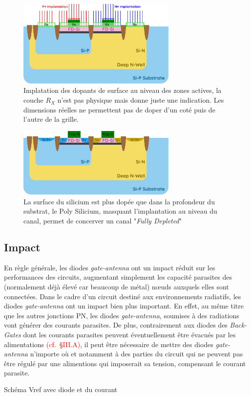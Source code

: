 \begin{figure}[H]
  \centering
  \includegraphics[width=0.7\textwidth]{figures/FabSOI-MiddleEND-3.5.pdf}
  \caption{Implatation des dopants de surface au niveau des zones actives, la couche $R_X$ n'est pas physique mais donne juste une indication. Les dimensions réelles ne permettent pas de doper d'un coté puis de l'autre de la grille.}
  \label{fig:process fdsoi 3}
\end{figure}


\begin{figure}[H]
  \centering
  \includegraphics[width=0.7\textwidth]{figures/FabSOI-MiddleEND-4.pdf}
  \caption{La surface du silicium est plus dopée que dans la profondeur du substrat, le Poly Silicium, masquant l'implantation au niveau du canal, permet de concerver un canal "\textit{Fully Depleted}"}
  \label{fig:process fdsoi 4}
\end{figure}

\subsection{Impact}
En règle générale, les diodes \textit{gate-antenna} ont un impact réduit sur les performances des circuits, augmentant simplement les capacité parasites des (normalement déjà élevé car beaucoup de métal) nœuds auxquels elles sont connectées. Dans le cadre d’un circuit destiné aux environnements radiatifs, les diodes \textit{gate-antenna} ont un impact bien plus important. En effet, au même titre que les autres jonctions PN, les diodes \textit{gate-antenna}, soumises à des radiations vont générer des courants parasites. De plus, contrairement aux diodes des \textit{Back-Gates} dont les courants parasites peuvent éventuellement être évacués par les alimentations \textcolor{red}{(cf. §III.A)}, il peut être nécessaire de mettre des diodes \textit{gate-antenna} n’importe où et notamment à des parties du circuit qui ne peuvent pas être régulé par une alimentions qui imposerait sa tension, compensant le courant parasite.
\begin{metsUneSource}
  Schéma Vref avec diode et du courant
\end{metsUneSource}

